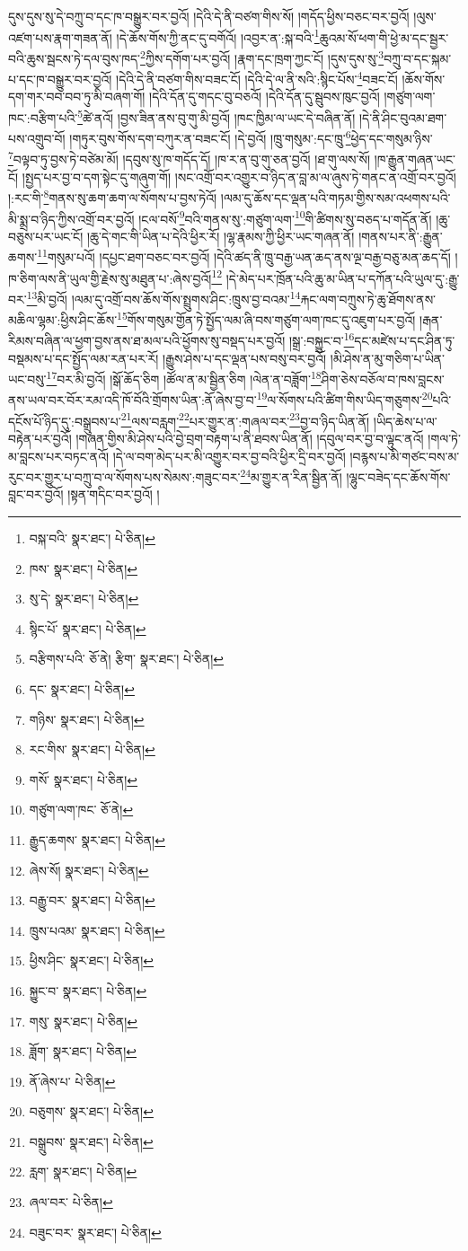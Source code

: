 དུས་དུས་སུ་དེ་བཀྲུ་བ་དང་ཁ་བསྒྱུར་བར་བྱའོ། །དེའི་དེ་ནི་བཙག་གིས་སོ། །གདོད་ཕྱིས་བཅང་བར་བྱའོ། །ལུས་འཛག་པས་རྣག་གཟན་ནོ། །དེ་ཆོས་གོས་ཀྱི་ནང་དུ་བགོའོ། །འབྱར་ན་:སྐ་བའི་\footnote{བསྐ་བའི་  སྣར་ཐང་།  པེ་ཅིན། }ཆུའམ་སོ་ཕག་གི་ཕྱེ་མ་དང་སྦྱར་བའི་ཆུས་སྦངས་ཏེ་དལ་བུས་ཁད་\footnote{ཁས་  སྣར་ཐང་།  པེ་ཅིན། }ཀྱིས་དགོག་པར་བྱའོ། །རྣག་དང་ཁྲག་ཀྱང་ངོ། །དུས་དུས་སུ་\footnote{སུ་དེ་  སྣར་ཐང་།  པེ་ཅིན། }བཀྲུ་བ་དང་སྐམ་པ་དང་ཁ་བསྒྱུར་བར་བྱའོ། །དེའི་དེ་ནི་བཙག་གིས་བཟང་ངོ། །དེའི་དེ་ལ་ནི་སའི་:སྙིང་པོས་\footnote{སྙིང་པོ་  སྣར་ཐང་།  པེ་ཅིན། }བཟང་ངོ། །ཆོས་གོས་དག་གར་བབ་བབ་ཏུ་མི་བཞག་གོ། །དེའི་དོན་དུ་གདང་བུ་བཅའོ། །དེའི་དོན་དུ་སྦུབས་ཁུང་བྱའོ། །གཙུག་ལག་ཁང་:བརྩིག་པའི་\footnote{བརྩིགས་པའི་  ཅོ་ནེ། རྩིག་  སྣར་ཐང་།  པེ་ཅིན། }ཚེ་ནའོ། །བྱས་ཟིན་ནས་བུ་གུ་མི་བྱའོ། །ཁང་ཁྱིམ་ལ་ཡང་དེ་བཞིན་ནོ། །དེ་ནི་ཤིང་བུའམ་ཐག་པས་འགྲུབ་བོ། །གཏུར་བུས་གོས་དག་བཀུར་ན་བཟང་ངོ། །དེ་བྱའོ། །ཁྲུ་གསུམ་:དང་ཁྲུ་\footnote{དང་  སྣར་ཐང་།  པེ་ཅིན། }ཕྱེད་དང་གསུམ་ཉིས་\footnote{གཉིས་  སྣར་ཐང་།  པེ་ཅིན། }བལྟབ་ཏུ་བྱས་ཏེ་བཙེམ་མོ། །དབུས་སུ་ཁ་གདོད་དོ། །ཁ་ར་ན་བུ་གུ་ཅན་བྱའོ། །ཐ་གུ་ལས་སོ། །ཁ་རྒྱུན་གཞན་ཡང་ངོ། །སྤྱད་པར་བྱ་བ་དག་སྟེང་དུ་གཞུག་གོ། །སང་འགྲོ་བར་འགྱུར་བ་ཉིད་ན་བླ་མ་ལ་ཞུས་ཏེ་གནང་ན་འགྲོ་བར་བྱའོ། །:རང་གི་\footnote{རང་གིས་  སྣར་ཐང་།  པེ་ཅིན། }གནས་སུ་ཆག་ཆག་ལ་སོགས་པ་བྱས་ཏེའོ། །ལམ་དུ་ཆོས་དང་ལྡན་པའི་གཏམ་གྱིས་སམ་འཕགས་པའི་མི་སྨྲ་བ་ཉིད་ཀྱིས་འགྲོ་བར་བྱའོ། །ངལ་བསོ་\footnote{གསོ་  སྣར་ཐང་།  པེ་ཅིན། }བའི་གནས་སུ་:གཙུག་ལག་\footnote{གཙུག་ལག་ཁང་  ཅོ་ནེ། }གི་ཚིགས་སུ་བཅད་པ་གདོན་ནོ། །ཆུ་བཅུས་པར་ཡང་ངོ། །ཆུ་དེ་གང་གི་ཡིན་པ་དེའི་ཕྱིར་རོ། །ལྷ་རྣམས་ཀྱི་ཕྱིར་ཡང་གཞན་ནོ། །གནས་པར་ནི་:རྒྱུན་ཆགས་\footnote{རྒྱུད་ཆགས་  སྣར་ཐང་།  པེ་ཅིན། }གསུམ་པའོ། །དཔྱང་ཐག་བཅང་བར་བྱའོ། །དེའི་ཚད་ནི་ཁྲུ་བརྒྱ་ཡན་ཆད་ནས་ལྔ་བརྒྱ་བཅུ་མན་ཆད་དོ། །ཁ་ཅིག་ལས་ནི་ཡུལ་གྱི་རྗེས་སུ་མཐུན་པ་:ཞེས་བྱའོ།\footnote{ཞེས་སོ།  སྣར་ཐང་།  པེ་ཅིན། } །དེ་མེད་པར་ཁྲོན་པའི་ཆུ་མ་ཡིན་པ་དཀོན་པའི་ཡུལ་དུ་:རྒྱུ་བར་\footnote{བརྒྱུ་བར་  སྣར་ཐང་།  པེ་ཅིན། }མི་བྱའོ། །ལམ་དུ་འགྲོ་བས་ཆོས་གོས་སྤྲུགས་ཤིང་:ཁྲུས་བྱ་བའམ་\footnote{ཁྲུས་པའམ་  སྣར་ཐང་།  པེ་ཅིན། }རྐང་ལག་བཀྲུས་ཏེ་ཆུ་ཐོགས་ནས་མཆིལ་ལྷམ་:ཕྱིས་ཤིང་ཆོས་\footnote{ཕྱིས་ཤིང་  སྣར་ཐང་།  པེ་ཅིན། }གོས་གསུམ་གྱོན་ཏེ་སྤྱོད་ལམ་ཞི་བས་གཙུག་ལག་ཁང་དུ་འཇུག་པར་བྱའོ། །རྒན་རིམས་བཞིན་ལ་ཕྱག་བྱས་ནས་ཐ་མལ་པའི་ཕྱོགས་སུ་བསྡད་པར་བྱའོ། །སྒྲ་:བསྐྱུང་བ་\footnote{སྐྱུང་བ་  སྣར་ཐང་།  པེ་ཅིན། }དང་མཛེས་པ་དང་ཤིན་ཏུ་བསྡམས་པ་དང་སྤྱོད་ལམ་རན་པར་རོ། །རྒྱུས་ཤེས་པ་དང་ལྡན་པས་བསུ་བར་བྱའོ། །མི་ཤེས་ན་མུ་གཅིག་པ་ཡིན་ཡང་བསུ་\footnote{གསུ་  སྣར་ཐང་།  པེ་ཅིན། }བར་མི་བྱའོ། །སྒོ་ཆོད་ཅིག །ཚོལ་ན་མ་སྦྱིན་ཅིག །ལེན་ན་བཟློག་\footnote{ཟློག་  སྣར་ཐང་།  པེ་ཅིན། }ཤིག་ཅེས་བཅོལ་བ་ཁས་བླངས་ནས་ཡལ་བར་བོར་རམ་འདི་ཁོ་བོའི་གྲོགས་ཡིན་:ནོ་ཞེས་བྱ་བ་\footnote{ནོ་ཞེས་པ་  པེ་ཅིན། }ལ་སོགས་པའི་ཚིག་གིས་ཡིད་གཅུགས་\footnote{བཅུགས་  སྣར་ཐང་།  པེ་ཅིན། }པའི་དངོས་པོ་ཉིད་དུ་:བསྒྲུབས་པ་\footnote{བསྒྲུབས་  སྣར་ཐང་།  པེ་ཅིན། }ལས་བརླག་\footnote{རླག་  སྣར་ཐང་།  པེ་ཅིན། }པར་གྱུར་ན་:གཞལ་བར་\footnote{ཞལ་བར་  པེ་ཅིན། }བྱ་བ་ཉིད་ཡིན་ནོ། །ཡིད་ཆེས་པ་ལ་བརྟེན་པར་བྱའོ། །གཞན་གྱིས་མི་ཤེས་པའི་བྱེ་བྲག་བརྟག་པ་ནི་ཐབས་ཡིན་ནོ། །དབུལ་བར་བྱ་བ་ལྟུང་ནའོ། །གལ་ཏེ་མ་བླངས་པར་བཏང་ནའོ། །དེ་ལ་བག་མེད་པར་མི་འགྱུར་བར་བྱ་བའི་ཕྱིར་དྲི་བར་བྱའོ། །བརྙས་པ་མི་གཙང་བས་མ་རུང་བར་གྱུར་པ་བཀྲུ་བ་ལ་སོགས་པས་སེམས་:གཟུང་བར་\footnote{བཟུང་བར་  སྣར་ཐང་།  པེ་ཅིན། }མ་གྱུར་ན་རིན་སྦྱིན་ནོ། །ལྷུང་བཟེད་དང་ཆོས་གོས་བླང་བར་བྱའོ། །སྟན་གདིང་བར་བྱའོ། །
